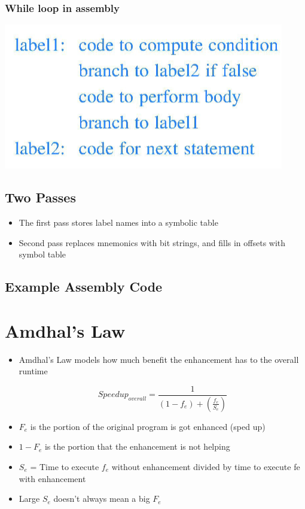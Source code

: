 \documentclass{article}
\begin{document}
\begin{itemize}
    
    \subsubsection{While loop in assembly}
    
    \includegraphics[scale=0.4]{images/while.png}
   
\end{itemize}

\subsection{Two Passes}
\begin{itemize}
    \item The first pass stores label names into a symbolic table
    \item Second pass replaces mnemonics with bit strings, and fills in offsets with symbol table
\end{itemize}

\subsection{Example Assembly Code}

\section{Amdhal's Law}

\begin{itemize}
    \item Amdhal's Law models how much benefit the enhancement has to the overall runtime
    
    \begin{equation}
        Speedup_{overall}=\frac{1}{(1-f_e) + (\frac{f_e}{S_e})}
    \end{equation}
    
    \item $F_e$ is the portion of the original program is got enhanced (sped up) 
    
    \item $1 - F_e$ is the portion that the enhancement is not helping
    
    \item $S_e$ = Time to execute $f_e$ without enhancement divided by time to execute fe with enhancement
    
    \item Large $S_e$ doesn't always mean a big $F_e$
    \end{itemize}
\end{document}
